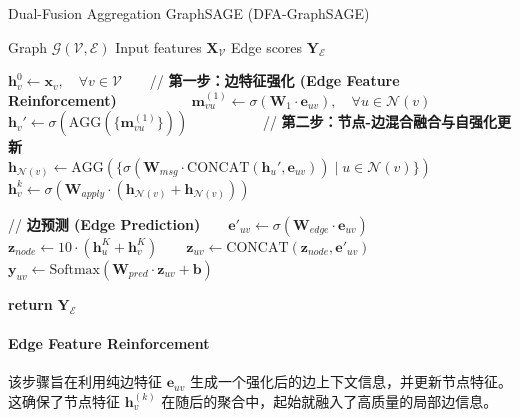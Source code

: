 \documentclass{article}
\begin{document}
\begin{algorithm}
\caption{Dual-Fusion Aggregation GraphSAGE (DFA-GraphSAGE)}
\label{alg:dfa-sage}
\begin{algorithmic}[1]
\Require Graph $\mathcal{G}(\mathcal{V}, \mathcal{E})$ 
\Require Input features $\mathbf{X}_{\mathcal{V}}$ 
\Ensure Edge scores $\mathbf{Y}_{\mathcal{E}}$ 

\State $\mathbf{h}_v^{0} \leftarrow \mathbf{x}_v, \quad \forall v \in \mathcal{V}$ 
 
    \State // \textbf{第一步：边特征强化 (Edge Feature Reinforcement)}
        \State $\mathbf{m}_{vu}^{(1)} \leftarrow \sigma(\mathbf{W}_{1} \cdot \mathbf{e}_{uv}), \quad \forall u \in \mathcal{N}(v)$
        \State $\mathbf{h}_v' \leftarrow \sigma(\text{AGG}(\{\mathbf{m}_{vu}^{(1)}\})) $ 
    \EndFor
    
    \State // \textbf{第二步：节点-边混合融合与自强化更新}
        \State $\mathbf{h}_{\mathcal{N}(v)} \leftarrow \text{AGG}(\{\sigma(\mathbf{W}_{msg} \cdot \text{CONCAT}(\mathbf{h}_u', \mathbf{e}_{uv})) \mid u \in \mathcal{N}(v)\})$
        \State $\mathbf{h}_v^k \leftarrow \sigma(\mathbf{W}_{apply} \cdot (\mathbf{h}_{\mathcal{N}(v)} + \mathbf{h}_{\mathcal{N}(v)}))$ 
    \EndFor
\EndFor

\State // \textbf{边预测 (Edge Prediction)}
    \State $\mathbf{e}'_{uv} \leftarrow \sigma(\mathbf{W}_{edge} \cdot \mathbf{e}_{uv})$
    \State $\mathbf{z}_{node} \leftarrow 10 \cdot (\mathbf{h}_u^K + \mathbf{h}_v^K)$ 
    \State $\mathbf{z}_{uv} \leftarrow \text{CONCAT}(\mathbf{z}_{node}, \mathbf{e}'_{uv})$
    \State $\mathbf{y}_{uv} \leftarrow \text{Softmax}(\mathbf{W}_{pred} \cdot \mathbf{z}_{uv} + \mathbf{b})$
\EndFor

\State \textbf{return} $\mathbf{Y}_{\mathcal{E}}$
\end{algorithmic}
\end{algorithm}

\paragraph{Edge Feature Reinforcement}

该步骤旨在利用纯边特征 $\mathbf{e}_{uv}$ 生成一个强化后的边上下文信息，并更新节点特征。这确保了节点特征 $\mathbf{h}_v^{(k)}$ 在随后的聚合中，起始就融入了高质量的局部边信息。
\end{document}
